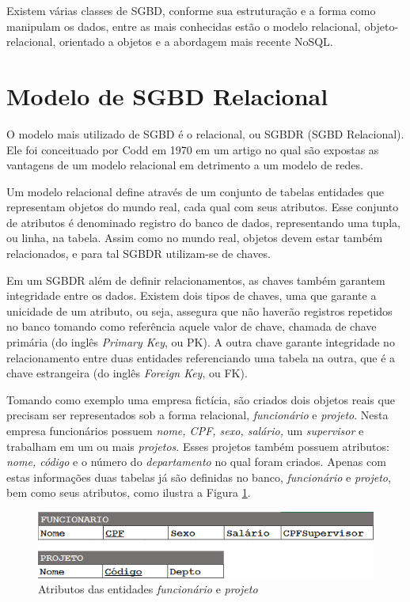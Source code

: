 Existem várias classes de SGBD, conforme sua estruturação e a forma como manipulam os dados, 
entre as mais conhecidas estão o modelo relacional, objeto-relacional, orientado a 
objetos e a abordagem mais recente NoSQL.

\section{Modelo de SGBD Relacional}

O modelo mais utilizado de SGBD é o relacional, ou SGBDR (SGBD Relacional). Ele foi conceituado por 
Codd \cite{codd1970relational} em 1970 em um artigo no qual são expostas as 
vantagens de um modelo relacional em detrimento a um modelo de redes. 

Um modelo relacional define através de um conjunto de tabelas entidades que representam 
objetos do mundo real, cada qual com seus atributos. Esse conjunto de atributos é 
denominado registro do banco de dados, representando uma tupla, ou linha, na tabela. Assim como no mundo real, 
objetos devem estar também relacionados, e para tal SGBDR utilizam-se de chaves.

Em um SGBDR além de definir relacionamentos, as chaves também garantem integridade entre os dados. 
Existem dois tipos de chaves, uma que garante a unicidade de um atributo, ou seja, assegura que 
não haverão registros repetidos no banco tomando como referência aquele valor de chave, chamada de chave primária (do inglês \textit{Primary Key}, ou PK). A outra chave garante integridade no relacionamento entre duas entidades referenciando uma tabela na outra, que 
é a chave estrangeira (do inglês \textit{Foreign Key}, ou FK).

Tomando como exemplo uma empresa fictícia, são criados dois objetos reais que precisam ser 
representados sob a forma relacional, \textit{funcionário} e \textit{projeto}. Nesta empresa funcionários possuem \textit{nome, 
CPF, sexo, salário,} um \textit{supervisor} e trabalham em um ou mais \textit{projetos}. Esses projetos também possuem atributos: 
\textit{nome, código} e o número do \textit{departamento} no qual foram criados. Apenas com estas informações duas tabelas já são definidas 
no banco, \textit{funcionário} e \textit{projeto}, bem como seus atributos, como ilustra a Figura \ref{fig:func_proj}.

\begin{figure}[htpb]
	\centering
		\includegraphics[width=13cm]{funcionario_projeto}
	\caption{Atributos das entidades \textit{funcionário} e \textit{projeto}}
	\label{fig:func_proj}
\end{figure}

